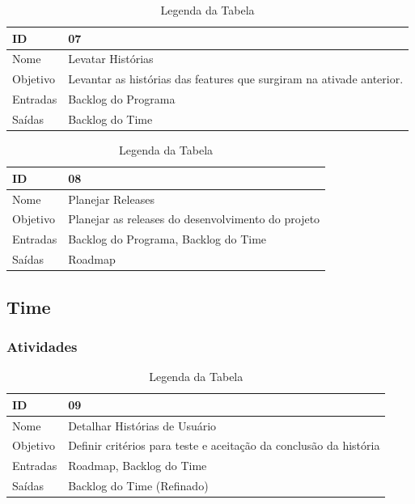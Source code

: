   \begin{table}[H]
    \centering
      \begin{tabular}{| m{5em} | m{10cm} |}
        \hline
        ID       & 07   \\ \hline
        Nome     & Levatar Histórias  \\ \hline
        Objetivo & Levantar as histórias das features que surgiram na ativade anterior.  \\ \hline
        Entradas & Backlog do Programa\\ \hline
        Saídas   & Backlog do Time \\ \hline
      \end{tabular}
      \caption{Legenda da Tabela}
      \label{tabela:atividade7}
  \end{table}

  \begin{table}[H]
    \centering
      \begin{tabular}{| m{5em} | m{10cm} |}
        \hline
        ID       & 08   \\ \hline
        Nome     & Planejar Releases  \\ \hline
        Objetivo & Planejar as releases do desenvolvimento do projeto \\ \hline
        Entradas & Backlog do Programa, Backlog do Time\\ \hline
        Saídas   & Roadmap \\ \hline
      \end{tabular}
      \caption{Legenda da Tabela}
      \label{tabela:atividade8}
  \end{table}

  \subsection{Time}

  \subsubsection{Atividades}

  \begin{table}[H]
    \centering
      \begin{tabular}{| m{5em} | m{10cm} |}
        \hline
        ID       & 09   \\ \hline
        Nome     & Detalhar Histórias de Usuário  \\ \hline
        Objetivo & Definir critérios para teste e aceitação da conclusão da história  \\ \hline
        Entradas & Roadmap, Backlog do Time\\ \hline
        Saídas   & Backlog do Time (Refinado) \\ \hline
      \end{tabular}
      \caption{Legenda da Tabela}
      \label{tabela:atividade9}
  \end{table}

